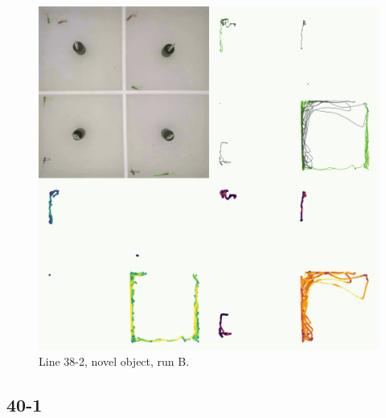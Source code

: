 \documentclass[
]{book}
\begin{document}
\begin{figure}
\includegraphics[width=1\linewidth]{figs/mikk_behaviour/four_panel_plots/novel_object_20191116_1309_21-2_R_B_300} \caption{Line 38-2, novel object, run B.}\label{fig:4p-21-2-no-B}
\end{figure}

\hypertarget{section-11}{%
\subsection{40-1}\label{section-11}}
\end{document}
